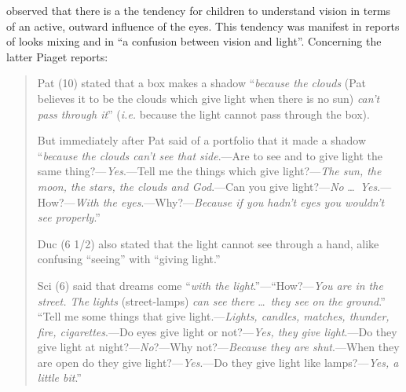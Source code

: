 \citet[48]{Piaget:1929dp} observed that there is a the tendency for children to understand vision in terms of an active, outward influence of the eyes. This tendency was manifest in reports of looks mixing and in ``a confusion between vision and light''. Concerning the latter Piaget reports:
\begin{quotation}

	Pat (10) stated that a box makes a shadow ``\emph{because the clouds} (Pat believes it to be the clouds which give light when there is no sun) \emph{can't pass through it}'' (\emph{i.e.} because the light cannot pass through the box).
	
	But immediately after Pat said of a portfolio that it made a shadow ``\emph{because the clouds can't see that side}.---Are to see and to give light the same thing?---\emph{Yes}.---Tell me the things which give light?---\emph{The sun, the moon, the stars, the clouds and God}.---Can you give light?---\emph{No} \ldots\ \emph{Yes}.---How?---\emph{With the eyes}.---Why?---\emph{Because if you hadn't eyes you wouldn't see properly}.''
	
	Duc (6 1/2) also stated that the light cannot see through a hand, alike confusing ``seeing'' with ``giving light.''
	
	Sci (6) said that dreams come ``\emph{with the light}.''---``How?---\emph{You are in the street. The lights} (street-lamps) \emph{can see there} \ldots\ \emph{they see on the ground}.'' ``Tell me some things that give light.---\emph{Lights, candles, matches, thunder, fire, cigarettes}.---Do eyes give light or not?---\emph{Yes, they give light}.---Do they give light at night?---\emph{No}?---Why not?---\emph{Because they are shut}.---When they are open do they give light?---\emph{Yes}.---Do they give light like lamps?---\emph{Yes, a little bit}.'' \citep[48]{Piaget:1929dp}
\end{quotation}

